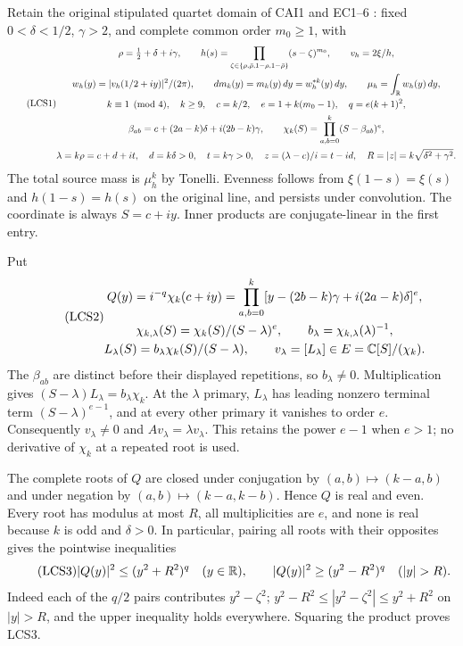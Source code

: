 Retain the original stipulated quartet domain of CAI1 and EC1--6
\cite{a04lcs:cai,a04lcs:ec}: fixed $0<\delta<1/2$, $\gamma>2$, and complete common
order $m_0\ge1$, with
\begin{equation}\tag{LCS1}
\begin{gathered}
 \rho=\tfrac12+\delta+i\gamma,\qquad
 h(s)=\prod_{\zeta\in\{\rho,\bar\rho,1-\rho,1-\bar\rho\}}
                      (s-\zeta)^{m_0},\qquad v_h=2\xi/h,\\
 w_h(y)=|v_h(1/2+iy)|^2/(2\pi),\qquad
 dm_k(y)=m_k(y)\,dy=w_h^{*k}(y)\,dy,\qquad
 \mu_h=\int_\mathbb R w_h(y)\,dy,\\
 k\equiv1\pmod4,\quad k\ge9,\quad c=k/2,\quad
 e=1+k(m_0-1),\quad q=e(k+1)^2,\\
 \beta_{ab}=c+(2a-k)\delta+i(2b-k)\gamma,\qquad
 \chi_k(S)=\prod_{a,b=0}^k(S-\beta_{ab})^e,\\
 \lambda=k\rho=c+d+it,\quad d=k\delta>0,\quad t=k\gamma>0,\quad
 z=(\lambda-c)/i=t-id,\quad R=|z|=k\sqrt{\delta^2+\gamma^2}.
\end{gathered}
\end{equation}
The total source mass is $\mu_h^k$ by Tonelli. Evenness follows from
$\xi(1-s)=\xi(s)$ and $h(1-s)=h(s)$ on the original line, and persists
under convolution. The coordinate is always $S=c+iy$. Inner products
are conjugate-linear in the first entry.

Put
\begin{equation}\tag{LCS2}
\begin{gathered}
 Q(y)=i^{-q}\chi_k(c+iy)
   =\prod_{a,b=0}^k
      [y-(2b-k)\gamma+i(2a-k)\delta]^e,\\
 \chi_{k,\lambda}(S)=\chi_k(S)/(S-\lambda)^e,\qquad
 b_\lambda=\chi_{k,\lambda}(\lambda)^{-1},\\
 L_\lambda(S)=b_\lambda\chi_k(S)/(S-\lambda),\qquad
 v_\lambda=[L_\lambda]\in E=\mathbb C[S]/(\chi_k).
\end{gathered}
\end{equation}
The $\beta_{ab}$ are distinct before their displayed repetitions, so
$b_\lambda\ne0$. Multiplication gives
$(S-\lambda)L_\lambda=b_\lambda\chi_k$. At the $\lambda$ primary,
$L_\lambda$ has leading nonzero terminal term
$(S-\lambda)^{e-1}$, and at every other primary it vanishes to order
$e$. Consequently $v_\lambda\ne0$ and $Av_\lambda=\lambda v_\lambda$.
This retains the power $e-1$ when $e>1$; no derivative of $\chi_k$ at
a repeated root is used.

The complete roots of $Q$ are closed under conjugation by
$(a,b)\mapsto(k-a,b)$ and under negation by
$(a,b)\mapsto(k-a,k-b)$. Hence $Q$ is real and even. Every root has
modulus at most $R$, all multiplicities are $e$, and none is real
because $k$ is odd and $\delta>0$. In particular, pairing all roots
with their opposites gives the pointwise inequalities
\begin{equation}\tag{LCS3}
 |Q(y)|^2\le(y^2+R^2)^q\quad(y\in\R),\qquad
 |Q(y)|^2\ge(y^2-R^2)^q\quad(|y|>R).
\end{equation}
Indeed each of the $q/2$ pairs contributes $y^2-\zeta^2$;
$y^2-R^2\le|y^2-\zeta^2|\le y^2+R^2$ on $|y|>R$, and the upper
inequality holds everywhere. Squaring the product proves LCS3.


